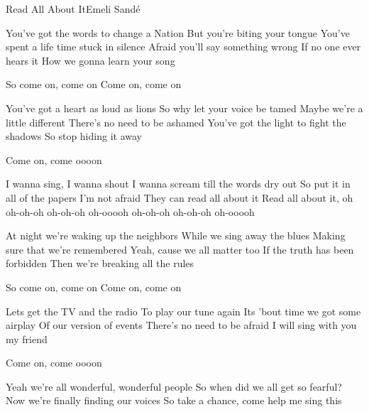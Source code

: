 \documentclass[a4paper,11pt,french]{article}
\begin{document}
\begin{Song}{Read All About It}{Emeli Sandé}
\begin{multicols}{2}

\begin{Verse}
You've got the words to change a Nation
But you're biting your tongue
You've spent a life time stuck in silence
Afraid you'll say something wrong
If no one ever hears it 
How we gonna learn your song
\espaceInterStrophe

So come on, come on
Come on, come on
\end{Verse}
\espaceInterStrophe

\begin{Verse}
You've got a heart as loud as lions
So why let your voice be tamed
Maybe we're a little different
There's no need to be ashamed
You've got the light to fight the shadows
So stop hiding it away
\espaceInterStrophe

Come on, come oooon
\end{Verse}
\espaceInterStrophe

\begin{Chorus}
I wanna sing, I wanna shout
I wanna scream till the words dry out
So put it in all of the papers
I'm not afraid
They can read all about it
Read all about it, oh
oh-oh-oh
oh-oh-oh
oh-ooooh
oh-oh-oh
oh-oh-oh
oh-ooooh
\end{Chorus}
\vfill
\columnbreak

\begin{Verse}
At night we're waking up the neighbors
While we sing away the blues
Making sure that we're remembered
Yeah, cause we all matter too
If the truth has been forbidden
Then we're breaking all the rules
\espaceInterStrophe

So come on, come on
Come on, come on
\end{Verse}
\espaceInterStrophe

\begin{Verse}
Lets get the TV and the radio
To play our tune again
Its 'bout time we got some airplay 
Of our version of events
There's no need to be afraid
I will sing with you my friend
\espaceInterStrophe

Come on, come oooon
\end{Verse}
\espaceInterStrophe

\tochorus
\espaceInterStrophe

\begin{Bridge}
Yeah we're all wonderful, wonderful people
So when did we all get so fearful?
Now we're finally finding our voices
So take a chance, come help me sing this
\espaceInterStrophe


\end{Bridge}
\end{multicols}
\end{Song}
\end{document}

